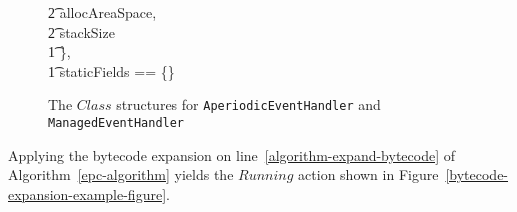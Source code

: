 \begin{figure}[tp!]
\begin{center}
\begin{minipage}{8cm}
\begin{axdef}
      \t2 allocAreaSpace, \\
      \t2 stackSize \\
      \t1 \}, \\
      \t1 staticFields == \{\} \\
      \rblot
    \end{axdef}
  \end{minipage}
  \end{center}
  \caption{The $Class$ structures for \texttt{AperiodicEventHandler}
    and \texttt{ManagedEventHandler}}
  \label{example-superclasses-model-figure}
\end{figure}%

Applying the bytecode expansion on
line~\ref{algorithm-expand-bytecode} of Algorithm~\ref{epc-algorithm}
yields the $Running$ action shown in
Figure~\ref{bytecode-expansion-example-figure}.
